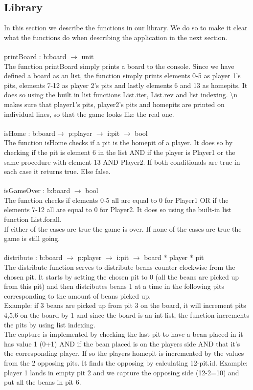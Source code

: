 \documentclass{article}
\begin{document}
\subsection*{Library}
In this section we describe the functions in our library. We do so to make it clear what the functions do when describing the application in the next section.\\
\\
printBoard : b:board $\rightarrow$ unit\\
The function printBoard simply prints a board to the console. Since we have defined a board as an list, the function simply prints elements 0-5 as player 1's pits, elements 7-12 as player 2's pits and lastly elements 6 and 13 as homepits.
It does so using the built in list functions List.iter, List.rev and list indexing. \textbackslash n makes sure that player1's pits, player2's pits and homepits are printed on individual lines, so that the game looks like the real one.\\
\\
isHome : b:board$\rightarrow$ p:player $\rightarrow$ i:pit $\rightarrow$ bool\\
The function isHome checks if a pit is the homepit of a player. It does so by checking if the pit is element 6 in the list AND if the player is Player1 or the same procedure with element 13 AND Player2. If both conditionals are true in each case it returns true.
Else false.\\
\\
isGameOver : b:board $\rightarrow$ bool\\
The function checks if elements 0-5 all are equal to 0 for Player1 OR if the elements 7-12 all are equal to 0 for Player2. It does so using the built-in list function List.forall.\\ If either of the cases are true the game is over. If none of the cases are true the game is still going.\\
\\
distribute : b:board $\rightarrow$ p:player $\rightarrow$ i:pit $\rightarrow$ board * player * pit\\
The distribute function serves to distribute beans counter clockwise from the chosen pit.
It starts by setting the chosen pit to 0 (all the beans are picked up from this pit) and then distributes beans 1 at a time in the following pits corresponding to the amount of beans picked up.\\
Example: if 3 beans are picked up from pit 3 on the board, it will increment pits 4,5,6 on the board by 1 and since the board is an int list, the function increments the pits by using list indexing.\\
The capture is implemented by checking the last pit to have a bean placed in it has value 1 (0+1) AND if the bean placed is on the players side AND that it's the corresponding player. If so the players homepit is incremented by the values from the 2 opposing pits. It finds the opposing by calculating 12-pit.id. 
Example: player 1 lands in empty pit 2 and we capture the opposing side (12-2=10) and put all the beans in pit 6.\\
\end{document}

